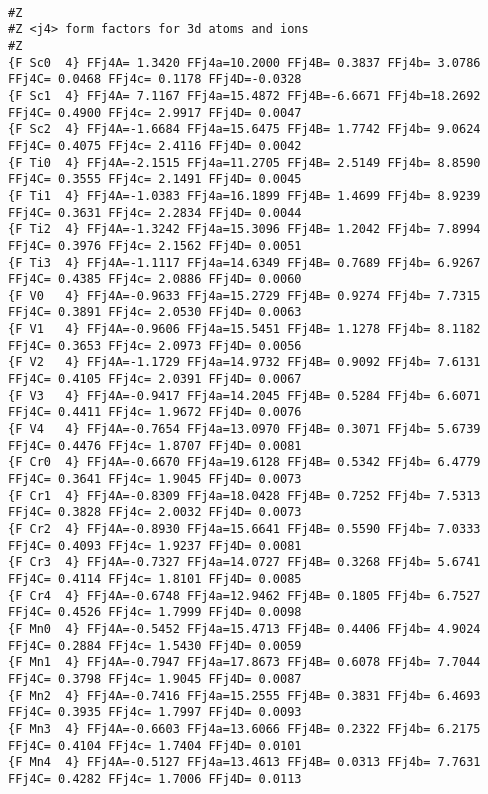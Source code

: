 {\begin{verbatim}
\end{verbatim}
\begin{verbatim}

#Z
#Z <j4> form factors for 3d atoms and ions
#Z
{F Sc0  4} FFj4A= 1.3420 FFj4a=10.2000 FFj4B= 0.3837 FFj4b= 3.0786 FFj4C= 0.0468 FFj4c= 0.1178 FFj4D=-0.0328 
{F Sc1  4} FFj4A= 7.1167 FFj4a=15.4872 FFj4B=-6.6671 FFj4b=18.2692 FFj4C= 0.4900 FFj4c= 2.9917 FFj4D= 0.0047 
{F Sc2  4} FFj4A=-1.6684 FFj4a=15.6475 FFj4B= 1.7742 FFj4b= 9.0624 FFj4C= 0.4075 FFj4c= 2.4116 FFj4D= 0.0042 
{F Ti0  4} FFj4A=-2.1515 FFj4a=11.2705 FFj4B= 2.5149 FFj4b= 8.8590 FFj4C= 0.3555 FFj4c= 2.1491 FFj4D= 0.0045 
{F Ti1  4} FFj4A=-1.0383 FFj4a=16.1899 FFj4B= 1.4699 FFj4b= 8.9239 FFj4C= 0.3631 FFj4c= 2.2834 FFj4D= 0.0044 
{F Ti2  4} FFj4A=-1.3242 FFj4a=15.3096 FFj4B= 1.2042 FFj4b= 7.8994 FFj4C= 0.3976 FFj4c= 2.1562 FFj4D= 0.0051 
{F Ti3  4} FFj4A=-1.1117 FFj4a=14.6349 FFj4B= 0.7689 FFj4b= 6.9267 FFj4C= 0.4385 FFj4c= 2.0886 FFj4D= 0.0060 
{F V0   4} FFj4A=-0.9633 FFj4a=15.2729 FFj4B= 0.9274 FFj4b= 7.7315 FFj4C= 0.3891 FFj4c= 2.0530 FFj4D= 0.0063 
{F V1   4} FFj4A=-0.9606 FFj4a=15.5451 FFj4B= 1.1278 FFj4b= 8.1182 FFj4C= 0.3653 FFj4c= 2.0973 FFj4D= 0.0056 
{F V2   4} FFj4A=-1.1729 FFj4a=14.9732 FFj4B= 0.9092 FFj4b= 7.6131 FFj4C= 0.4105 FFj4c= 2.0391 FFj4D= 0.0067 
{F V3   4} FFj4A=-0.9417 FFj4a=14.2045 FFj4B= 0.5284 FFj4b= 6.6071 FFj4C= 0.4411 FFj4c= 1.9672 FFj4D= 0.0076 
{F V4   4} FFj4A=-0.7654 FFj4a=13.0970 FFj4B= 0.3071 FFj4b= 5.6739 FFj4C= 0.4476 FFj4c= 1.8707 FFj4D= 0.0081 
{F Cr0  4} FFj4A=-0.6670 FFj4a=19.6128 FFj4B= 0.5342 FFj4b= 6.4779 FFj4C= 0.3641 FFj4c= 1.9045 FFj4D= 0.0073 
{F Cr1  4} FFj4A=-0.8309 FFj4a=18.0428 FFj4B= 0.7252 FFj4b= 7.5313 FFj4C= 0.3828 FFj4c= 2.0032 FFj4D= 0.0073 
{F Cr2  4} FFj4A=-0.8930 FFj4a=15.6641 FFj4B= 0.5590 FFj4b= 7.0333 FFj4C= 0.4093 FFj4c= 1.9237 FFj4D= 0.0081 
{F Cr3  4} FFj4A=-0.7327 FFj4a=14.0727 FFj4B= 0.3268 FFj4b= 5.6741 FFj4C= 0.4114 FFj4c= 1.8101 FFj4D= 0.0085 
{F Cr4  4} FFj4A=-0.6748 FFj4a=12.9462 FFj4B= 0.1805 FFj4b= 6.7527 FFj4C= 0.4526 FFj4c= 1.7999 FFj4D= 0.0098 
{F Mn0  4} FFj4A=-0.5452 FFj4a=15.4713 FFj4B= 0.4406 FFj4b= 4.9024 FFj4C= 0.2884 FFj4c= 1.5430 FFj4D= 0.0059 
{F Mn1  4} FFj4A=-0.7947 FFj4a=17.8673 FFj4B= 0.6078 FFj4b= 7.7044 FFj4C= 0.3798 FFj4c= 1.9045 FFj4D= 0.0087 
{F Mn2  4} FFj4A=-0.7416 FFj4a=15.2555 FFj4B= 0.3831 FFj4b= 6.4693 FFj4C= 0.3935 FFj4c= 1.7997 FFj4D= 0.0093 
{F Mn3  4} FFj4A=-0.6603 FFj4a=13.6066 FFj4B= 0.2322 FFj4b= 6.2175 FFj4C= 0.4104 FFj4c= 1.7404 FFj4D= 0.0101 
{F Mn4  4} FFj4A=-0.5127 FFj4a=13.4613 FFj4B= 0.0313 FFj4b= 7.7631 FFj4C= 0.4282 FFj4c= 1.7006 FFj4D= 0.0113 

\end{verbatim}}
